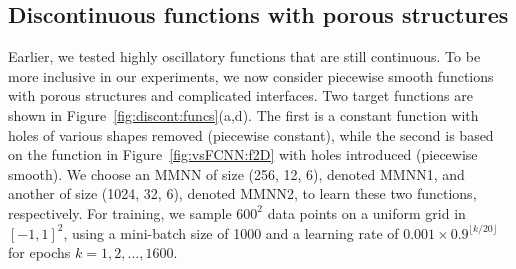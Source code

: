 \documentclass[review,hidelinks,onefignum,onetabnum]{siamart250211}
\begin{document}












\subsection{Discontinuous functions with porous structures}
\label{sec:discontinuous:func:porous}


Earlier, we tested highly oscillatory functions that are still continuous. To be more inclusive in our experiments, we now consider piecewise smooth functions with porous structures and complicated interfaces. Two target functions are shown in Figure~\ref{fig:discont:funcs}(a,d). The first is a constant function with holes of various shapes removed (piecewise constant), while the second is based on the function in Figure~\ref{fig:vsFCNN:f2D} with holes introduced (piecewise smooth). We choose an MMNN of size (256, 12, 6), denoted MMNN1, and another of size (1024, 32, 6), denoted MMNN2, to learn these two functions, respectively. For training, we sample \(600^2\) data points on a uniform grid in \([-1,1]^2\), using a mini-batch size of 1000 and a learning rate of \(0.001 \times 0.9^{\lfloor k/20 \rfloor}\) for epochs \(k = 1, 2, \dots, 1600\).
\end{document}
